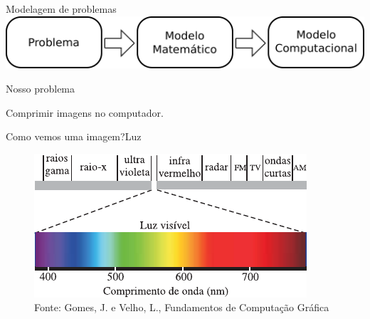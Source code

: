 \documentclass{beamer}
\begin{document}
%
%

\begin{frame}{Modelagem de problemas}
    \includegraphics[width=\textwidth]{figs/paradigmas.pdf}
\end{frame}

\begin{frame}{Nosso problema}
    \begin{center}
    Comprimir imagens no computador.
    \end{center}
\end{frame}

\begin{frame}{Como vemos uma imagem?}{Luz}
    \begin{figure}
        \centering
        \includegraphics[scale=1.0]{figs/espectro-luz.pdf}
        \caption{Fonte: Gomes, J. e Velho, L., Fundamentos de Computa\c{c}\~ao
        Gr\'afica}
    \end{figure}
\end{frame}
\end{document}

